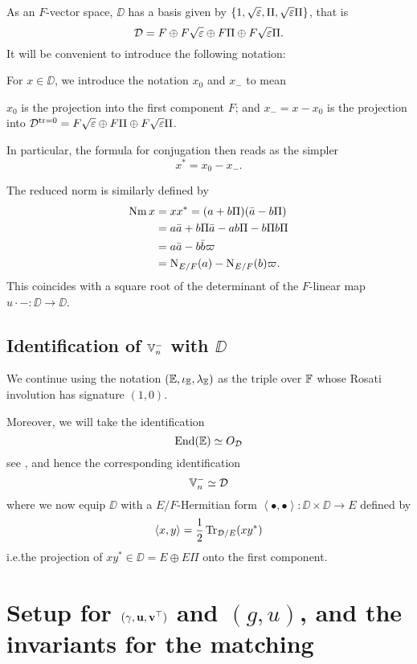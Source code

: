 As an $F$-vector space, $\DD$ has a basis given by
$\{1, \sqrt{\varepsilon}, \Pi, \sqrt{\varepsilon}\Pi\}$, that is
\[ \mathcal D = F \oplus F\sqrt{\varepsilon} \oplus F \Pi \oplus F\sqrt{\varepsilon}\Pi. \]
It will be convenient to introduce the following notation:
\begin{definition}
  For $x \in \DD$, we introduce the notation $x_0$ and $x_-$ to mean
  \begin{itemize}
    \ii $x_0$ is the projection into the first component $F$; and
    \ii $x_- = x - x_0$ is the projection into
    $\mathcal D^{\operatorname{tr} = 0} = F\sqrt{\varepsilon} \oplus F \Pi \oplus F\sqrt{\varepsilon}\Pi$.
  \end{itemize}
\end{definition}
In particular, the formula for conjugation then reads as the simpler
\[ x^\ast = x_0 - x_-. \]

The reduced norm is similarly defined by
\begin{align*}
  \operatorname{Nm} x &= x x^\ast = (a + b \Pi)(\bar a - b \Pi) \\
  &= a \bar a + b \Pi \bar a - a b \Pi - b \Pi b \Pi \\
  &= a \bar a - b \bar b \varpi \\
  &= \operatorname{N}_{E/F}(a) - \operatorname{N}_{E/F}(b) \varpi .
\end{align*}
This coincides with a square root of
the determinant of the $F$-linear map $u \cdot - \colon \DD \to \DD$.

\subsection{Identification of $\mathbb V_n^-$ with $\DD$}
We continue using the notation $(\mathbb E, \iota_\mathbb E, \lambda_\mathbb E)$ as the triple over $\mathbb F$
whose Rosati involution has signature $(1,0)$.

Moreover, we will take the identification
\[ \operatorname{End}(\mathbb E) \simeq O_\mathcal D \]
see \cite[Remark 2.5]{ref:KR},
and hence the corresponding identification
\[ \mathbb V_n^- \simeq \mathcal D \]
where we  now equip $\DD$ with a $E/F$-Hermitian form
$\left\langle \bullet, \bullet \right\rangle \colon \DD \times \DD \to E$
defined by
\[ \left\langle x,y \right\rangle = \frac{1}{2} \operatorname{Tr}_{\mathcal D/E}(xy^\ast) \]
i.e.\. the projection of $xy^\ast \in \DD = E \oplus E\Pi$ onto the first component.

\section{Setup for ${(\gamma, \mathbf u, \mathbf v^\top)}$ and $(g,u)$, and the invariants for the matching}
